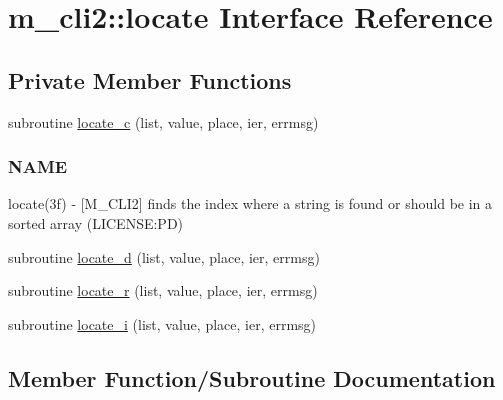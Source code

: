 \hypertarget{interfacem__cli2_1_1locate}{}\section{m\+\_\+cli2\+:\+:locate Interface Reference}
\label{interfacem__cli2_1_1locate}
\subsection*{Private Member Functions}
\begin{DoxyCompactItemize}
\item 
subroutine \mbox{\hyperlink{interfacem__cli2_1_1locate_a59a1546b8eab776a0ba5594b6b90ae72}{locate\+\_\+c}} (list, value, place, ier, errmsg)
\begin{DoxyCompactList}\small\item\em \subsubsection*{N\+A\+ME}

locate(3f) -\/ \mbox{[}M\+\_\+\+C\+L\+I2\mbox{]} finds the index where a string is found or should be in a sorted array (L\+I\+C\+E\+N\+SE\+:PD) \end{DoxyCompactList}\item 
subroutine \mbox{\hyperlink{interfacem__cli2_1_1locate_ac8d6a83fb2617b1a370d6f4142cfbf6b}{locate\+\_\+d}} (list, value, place, ier, errmsg)
\item 
subroutine \mbox{\hyperlink{interfacem__cli2_1_1locate_a93368b61603fe74c498b1190a502c271}{locate\+\_\+r}} (list, value, place, ier, errmsg)
\item 
subroutine \mbox{\hyperlink{interfacem__cli2_1_1locate_a4bc5036ad18af931624efb52459bdef3}{locate\+\_\+i}} (list, value, place, ier, errmsg)
\end{DoxyCompactItemize}


\subsection{Member Function/\+Subroutine Documentation}
\mbox{\label{interfacem__cli2_1_1locate_a59a1546b8eab776a0ba5594b6b90ae72}} 
